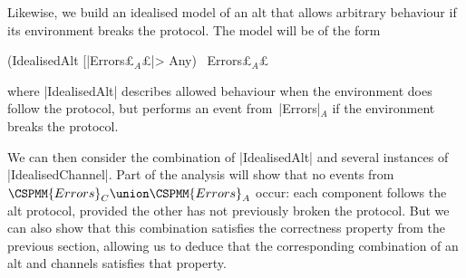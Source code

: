 Likewise, we build an idealised model of an alt that allows arbitrary
behaviour if its environment breaks the protocol.  The model will be of the
form 
%
\begin{cspm}
(IdealisedAlt [|Errors£$_A$£|> Any) \ Errors£$_A$£
\end{cspm}
%
where |IdealisedAlt| describes allowed behaviour when the environment does
follow the protocol, but performs an event from~|Errors|$_A$ if the
environment breaks the protocol.

We can then consider the combination of |IdealisedAlt| and several instances
of |IdealisedChannel|.  Part of the analysis will show that no events from
$\CSPMM{Errors}_C \union \CSPMM{Errors}_A$ occur: each component follows the
alt protocol, provided the other has not previously broken the protocol.  But
we can also show that this combination satisfies the correctness property from
the previous section, allowing us to deduce that the corresponding combination
of an alt and channels satisfies that property.


